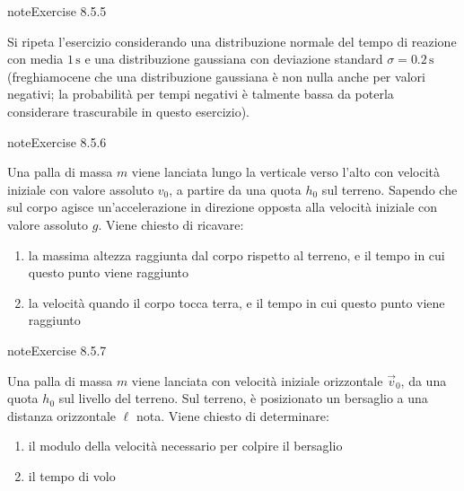 \documentclass[letterpaper,10pt,italian]{jupyterBook}
\begin{document}
\begin{sphinxadmonition}{note}{Exercise 8.5.5}



\sphinxAtStartPar
Si ripeta l’esercizio considerando una distribuzione normale del tempo di reazione con media \(1 \, \text{s}\) e una distribuzione gaussiana con deviazione standard \(\sigma = 0.2 \, \text{s}\) (freghiamocene che una distribuzione gaussiana è non nulla anche per valori negativi; la probabilità per tempi negativi è talmente bassa da poterla considerare trascurabile in questo esercizio).
\end{sphinxadmonition}
 \label{exercise:ch/mechanics/kinematics-problems-exercise-5}

\begin{sphinxadmonition}{note}{Exercise 8.5.6}



\sphinxAtStartPar
Una palla di massa \(m\) viene lanciata lungo la verticale verso l’alto con velocità iniziale con valore assoluto \(v_0\), a partire da una quota \(h_0\) sul terreno. Sapendo che sul corpo agisce un’accelerazione in direzione opposta alla velocità iniziale con valore assoluto \(g\). Viene chiesto di ricavare:
\begin{enumerate}
%
\item {} 
\sphinxAtStartPar
la massima altezza raggiunta dal corpo rispetto al terreno, e il tempo in cui questo punto viene raggiunto

\item {} 
\sphinxAtStartPar
la velocità quando il corpo tocca terra, e il tempo in cui questo punto viene raggiunto

\end{enumerate}
\end{sphinxadmonition}
 \label{exercise:ch/mechanics/kinematics-problems-exercise-6}

\begin{sphinxadmonition}{note}{Exercise 8.5.7}



\sphinxAtStartPar
Una palla di massa \(m\) viene lanciata con velocità iniziale orizzontale \(\vec{v}_0\), da una quota \(h_0\) sul livello del terreno. Sul terreno, è posizionato un bersaglio a una distanza orizzontale \(\ell\) nota. Viene chiesto di determinare:
\begin{enumerate}
%
\item {} 
\sphinxAtStartPar
il modulo della velocità necessario per colpire il bersaglio

\item {} 
\sphinxAtStartPar
il tempo di volo

\end{enumerate}
\end{sphinxadmonition}
 \label{exercise:ch/mechanics/kinematics-problems-exercise-7}
\end{document}
